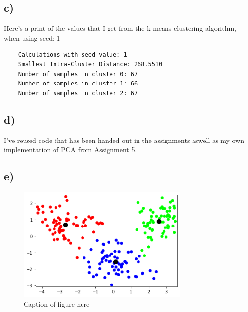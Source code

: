 \subsection {c)}
Here's a print of the values that I get from the k-means clustering algorithm, when
using seed: 1
\begin{verbatim}
    Calculations with seed value: 1
    Smallest Intra-Cluster Distance: 268.5510
    Number of samples in cluster 0: 67
    Number of samples in cluster 1: 66
    Number of samples in cluster 2: 67
\end{verbatim}

\subsection {d)}
I've reused code that has been handed out in the assignments aswell
as my own implementation of PCA from Assignment 5.

\subsection {e)}
\begin{figure}[H]
    \centering
        \includegraphics[width=0.75\textwidth]{Figures/K-means.png}
    \caption{Caption of figure here}
\end{figure}
